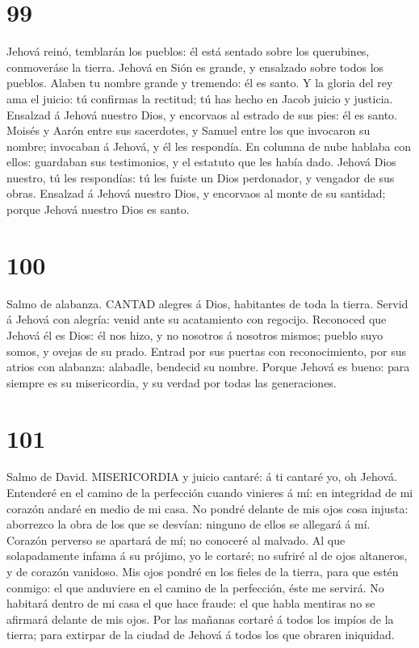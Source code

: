 \hypertarget{section-98}{%
\section{99}\label{section-98}}

 Jehová reinó, temblarán los pueblos: él está sentado sobre
los querubines, conmoveráse la tierra.  Jehová en Sión es
grande, y ensalzado sobre todos los pueblos.  Alaben tu
nombre grande y tremendo: él es santo.  Y la gloria del rey
ama el juicio: tú confirmas la rectitud; tú has hecho en Jacob juicio y
justicia.  Ensalzad á Jehová nuestro Dios, y encorvaos al
estrado de sus pies: él es santo.  Moisés y Aarón entre sus
sacerdotes, y Samuel entre los que invocaron su nombre; invocaban á
Jehová, y él les respondía.  En columna de nube hablaba con
ellos: guardaban sus testimonios, y el estatuto que les había dado.
 Jehová Dios nuestro, tú les respondías: tú les fuiste un
Dios perdonador, y vengador de sus obras.  Ensalzad á Jehová
nuestro Dios, y encorvaos al monte de su santidad; porque Jehová nuestro
Dios es santo.

\hypertarget{section-99}{%
\section{100}\label{section-99}}

 Salmo de alabanza. CANTAD alegres á Dios, habitantes de
toda la tierra.  Servid á Jehová con alegría: venid ante su
acatamiento con regocijo.  Reconoced que Jehová él es Dios:
él nos hizo, y no nosotros á nosotros mismos; pueblo suyo somos, y
ovejas de su prado.  Entrad por sus puertas con
reconocimiento, por sus atrios con alabanza: alabadle, bendecid su
nombre.  Porque Jehová es bueno: para siempre es su
misericordia, y su verdad por todas las generaciones.

\hypertarget{section-100}{%
\section{101}\label{section-100}}

 Salmo de David. MISERICORDIA y juicio cantaré: á ti cantaré
yo, oh Jehová.  Entenderé en el camino de la perfección
cuando vinieres á mí: en integridad de mi corazón andaré en medio de mi
casa.  No pondré delante de mis ojos cosa injusta: aborrezco
la obra de los que se desvían: ninguno de ellos se allegará á mí.
 Corazón perverso se apartará de mí; no conoceré al malvado.
 Al que solapadamente infama á su prójimo, yo le cortaré; no
sufriré al de ojos altaneros, y de corazón vanidoso.  Mis
ojos pondré en los fieles de la tierra, para que estén conmigo: el que
anduviere en el camino de la perfección, éste me servirá. 
No habitará dentro de mi casa el que hace fraude: el que habla mentiras
no se afirmará delante de mis ojos.  Por las mañanas cortaré
á todos los impíos de la tierra; para extirpar de la ciudad de Jehová á
todos los que obraren iniquidad.

